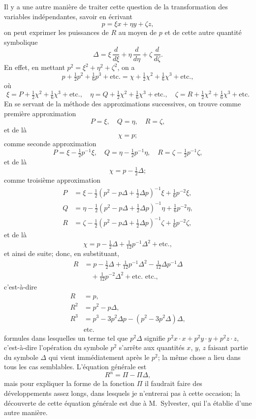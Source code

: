 \documentclass[11pt,a4paper]{book}
\theoremstyle{plain}
\begin{document}
Il y a une autre mani\`{e}re de traiter cette question de la transformation des variables ind\'{e}pendantes, savoir en \'{e}crivant
\[
p=\xi x+\eta y+\zeta z,
\]
on peut exprimer les puissances de $R$ au moyen de $p$ et de cette autre quantit\'{e} symbolique
\[
\Delta=\xi\,\frac{d}{d\xi}+\eta\,\frac{d}{d\eta}+\zeta\,\frac{d}{d\zeta}.
\]
En effet, en mettant $p^2=\xi^2+\eta^2+\zeta^2$, on a
\[
p+\tfrac{1}{2}p^2+\tfrac{1}{6}p^3+\text{etc.}=\chi+\tfrac{1}{2}\chi^2+\tfrac{1}{6}\chi^3+\text{etc.},
\]
o\`{u}
\[
\xi=P+\tfrac{1}{2}\chi^2+\tfrac{1}{6}\chi^3+\text{etc.},\quad
\eta=Q+\tfrac{1}{2}\chi^2+\tfrac{1}{6}\chi^3+\text{etc.},\quad
\zeta=R+\tfrac{1}{2}\chi^2+\tfrac{1}{6}\chi^3+\text{etc.}
\]
En se servant de la m\'{e}thode des approximations successives, on trouve comme premi\`{e}re approximation
\[
P=\xi,\quad Q=\eta,\quad R=\zeta,
\]
et de l\`{a}
\[
\chi=p;
\]
comme seconde approximation
\[
P=\xi-\tfrac{1}{2}p^{-1}\xi,\quad Q=\eta-\tfrac{1}{2}p^{-1}\eta,\quad R=\zeta-\tfrac{1}{2}p^{-1}\zeta,
\]
et de l\`{a}
\[
\chi=p-\tfrac{1}{2}\Delta;
\]
comme troisi\`{e}me approximation
\begin{align*}
P&=\xi-\tfrac{1}{2}(p^2-p\Delta+\tfrac{1}{2}\Delta p)^{-1}\xi+\tfrac{1}{6}p^{-2}\xi,\\
Q&=\eta-\tfrac{1}{2}(p^2-p\Delta+\tfrac{1}{2}\Delta p)^{-1}\eta+\tfrac{1}{6}p^{-2}\eta,\\
R&=\zeta-\tfrac{1}{2}(p^2-p\Delta+\tfrac{1}{2}\Delta p)^{-1}\zeta+\tfrac{1}{6}p^{-2}\zeta,
\end{align*}
et de l\`{a}
\[
\chi=p-\tfrac{1}{2}\Delta+\tfrac{1}{12}p^{-1}\Delta^2+\text{etc.},
\]
et ainsi de suite; donc, en substituant,
\begin{align*}
R&=p-\tfrac{1}{2}\Delta+\tfrac{1}{12}p^{-1}\Delta^2-\tfrac{1}{12}\Delta p^{-1}\Delta\\
&\quad +\tfrac{1}{12}p^{-2}\Delta^2+\text{etc. etc.},
\end{align*}
c'est-\`{a}-dire
\begin{align*}
R&=p,\\
R^2&=p^2-p\Delta,\\
R^3&=p^3-3p^2\Delta p-(p^2-3p^2\Delta)\Delta,\\
&\text{etc.}
\end{align*}
formules dans lesquelles un terme tel que $p^2\Delta$ signifie $p^2x\cdot x+p^2y\cdot y+p^2z\cdot z$, c'est-\`{a}-dire l'op\'{e}ration du symbole $p^2$ s'arr\^{e}te aux quantit\'{e}s $x$, $y$, $z$ faisant partie du symbole $\Delta$ qui vient imm\'{e}diatement apr\`{e}s le $p^2$; la m\^{e}me chose a lieu dans tous les cas semblables. L'\'{e}quation g\'{e}n\'{e}rale est
\[
R^n=\Pi-\Pi\Delta,
\]
mais pour expliquer la forme de la fonction $\Pi$ il faudrait faire des d\'{e}veloppements assez longs, dans lesquels je n'entrerai pas \`{a} cette occasion; la d\'{e}couverte de cette \'{e}quation g\'{e}n\'{e}rale est due \`{a} M.~Sylvester, qui l'a \'{e}tablie d'une autre mani\`{e}re.
\end{document}

